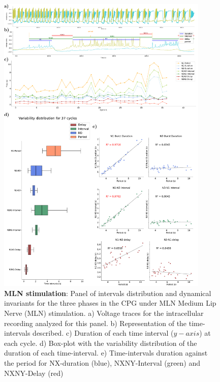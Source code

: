 \begin{figure}[htbp]
	\centering
	\includegraphics[width=0.9\textwidth]{./img/invariants/data/SUSSEX/MLN_driven/images/panel_with_intervals.pdf}
	\caption{\textbf{MLN stimulation}: Panel of intervals distribution and dynamical invariants for the three phases in the CPG under MLN Medium Lip Nerve (MLN) stimulation. a) Voltage traces for the intracellular recording analyzed for this panel. b) Representation of the time-intervals described. c) Duration of each time interval ($y-axis$) at each cycle. d) Box-plot with the variability distribution of the duration of each time-interval. e) Time-intervals duration against the period for NX-duration (blue), NXNY-Interval (green) and NXNY-Delay (red)}
	\label{fig:mln stimulation}
\end{figure}


